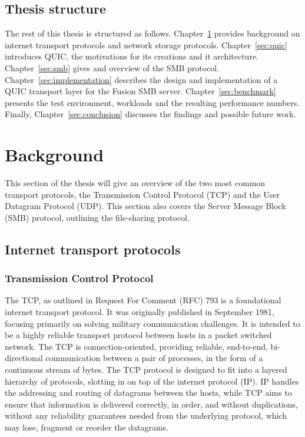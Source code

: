 \documentclass[english, 12pt, a4paper, elec, utf8, a-2b, online]{aaltothesis}
\begin{document}
\subsection{Thesis structure}

The rest of this thesis is structured as follows. Chapter~\ref{sec:background} provides
background on internet transport protocols and network storage protocols. Chapter~\ref{sec:quic} introduces
QUIC, the motivations for its creations and it architecture. Chapter~\ref{sec:smb} gives
and overview of the SMB protocol. Chapter~\ref{sec:implementation} describes the design
and implementation of a QUIC transport layer for the Fusion SMB server. Chapter~\ref{sec:benchmark}
presents the test environment, workloads and the resulting performance numbers. Finally, Chapter~\ref{sec:conclusion}
discusses the findings and possible future work.
\clearpage

\section{Background}
\label{sec:background}
This section of the thesis will give an overview of the two most common transport
protocols, the Transmission Control Protocol (TCP) and the User Datagram Protocol (UDP).
This section also covers the Server Message Block (SMB) protocol, outlining the
file-sharing protocol.
\subsection{Internet transport protocols}
\subsubsection{Transmission Control Protocol}
The TCP, as outlined in Request For Comment (RFC)
793 is a foundational internet transport protocol. It was
originally published in September 1981, focusing primarily on solving military
communication challenges. It is intended to be a highly reliable transport
protocol between hosts in a packet switched network. The TCP is connection-oriented,
providing reliable, end-to-end, bi-directional communication between a pair of processes, in the
form of a continuous stream of bytes. The TCP protocol is designed to fit into
a layered hierarchy of protocols, slotting
in on top of the internet protocol (IP)\cite{rfc791}. IP handles the addressing
and routing of datagrams between the hosts, while TCP aims to ensure that
information is delivered correctly, in order, and without duplications, without
any reliability guarantees needed from the underlying protocol, which may lose,
fragment or reorder the datagrams\cite{rfc793}.
\end{document}
